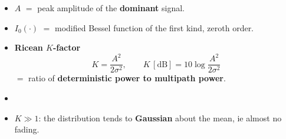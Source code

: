 {\begin{itemize}
  \item $A$ $=$ peak amplitude of the \textbf{dominant} signal.
  \item $I_0(\cdot)$ $=$ modified Bessel function of the first kind, zeroth order.
  \item \textbf{Ricean $K$-factor}
        \[ K = \frac{A^2}{2\sigma^2}, \qquad K\,[\text{dB}] = 10\log\frac{A^2}{2\sigma^2} \]
        $=$ ratio of \textbf{deterministic power to multipath power}.
  \item {}
  \item $K \gg 1$: the distribution tends to \textbf{Gaussian} about the mean, ie almost no
        fading.
\end{itemize}}

